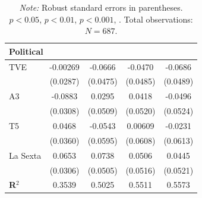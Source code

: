 \documentclass[12pt]{article}
\begin{document}
\begin{table}[htbp]
\begin{tabular}{lcccc}
			\multicolumn{5}{l}{\textbf{Political}}\\
			\hline
			TVE       & -0.00269      & -0.0666       & -0.0470       & -0.0686       \\
			& (0.0287)      & (0.0475)      & (0.0485)      & (0.0489)      \\
			A3        & -0.0883\sym{**}& 0.0295       & 0.0418        & -0.0496       \\
			& (0.0308)      & (0.0509)      & (0.0520)      & (0.0524)      \\
			T5        & 0.0468        & -0.0543       & 0.00609       & -0.0231       \\
			& (0.0360)      & (0.0595)      & (0.0608)      & (0.0613)      \\
			La Sexta  & 0.0653\sym{*} & 0.0738        & 0.0506        & 0.0445        \\
			& (0.0306)      & (0.0505)      & (0.0516)      & (0.0521)      \\
			\hline\hline
			\textbf{R$^2$} & 0.3539 & 0.5025 & 0.5511 & 0.5573 \\
			\hline\hline
		\end{tabular}
		\caption*{\small \textit{Note:} Robust standard errors in parentheses. 
			$p<0.05$, \sym{*} $p<0.01$, \sym{**} $p<0.001$, \sym{***}. 
			Total observations: $N=687$.}
	\end{table}
	
	
	
\end{document}
